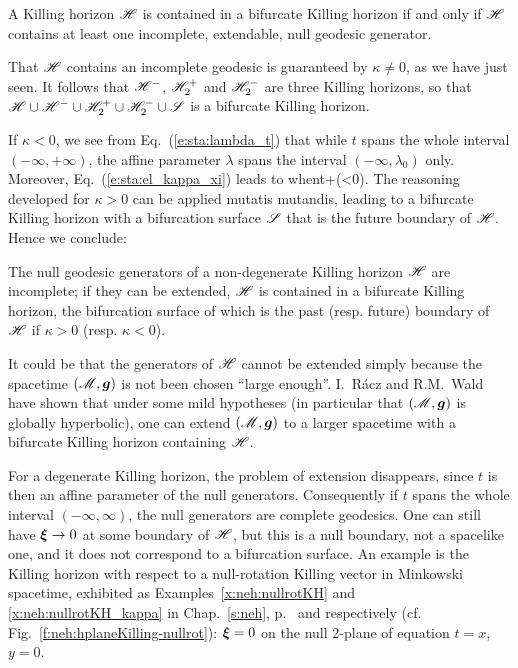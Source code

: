 \begin{prop}
\label{p:sta:Boyer_thm}
A Killing horizon $\mathscr{H}$ is contained in a bifurcate Killing horizon if and
only if $\mathscr{H}$ contains at least one incomplete, extendable, null geodesic
generator.
\end{prop}

That $\mathscr{H}$ contains an incomplete geodesic is guaranteed by
$\kappa\not=0$, as we have just seen.
It follows that $\mathscr{H}^-$, $\mathscr{H}_2^+$ and $\mathscr{H}_2^-$
are three Killing horizons, so that $\mathscr{H}\cup\mathscr{H}^-\cup\mathscr{H}_2^+\cup\mathscr{H}_2^-\cup\mathscr{S}$
is a bifurcate Killing horizon.

If $\kappa<0$, we see from Eq.~(\ref{e:sta:lambda_t}) that while $t$ spans the
whole interval $(-\infty,+\infty)$, the affine parameter $\lambda$ spans the
interval $(-\infty,\lambda_0)$ only. Moreover, Eq.~(\ref{e:sta:el_kappa_xi})
leads to
\be
    \w{\xi}  \quad\mbox{when}\quad t\rightarrow +\infty  \qquad (\kappa<0).
\ee
The reasoning developed for $\kappa>0$ can be applied mutatis mutandis,
leading to a bifurcate Killing horizon with a bifurcation surface $\mathscr{S}$ that
is the future boundary of $\mathscr{H}$. Hence we conclude:
\begin{prop}
\label{p:sta:non_degen_bifurcate}
The null geodesic generators of a non-degenerate Killing horizon $\mathscr{H}$ are
incomplete; if they can be extended, $\mathscr{H}$ is contained in a
bifurcate Killing horizon, the bifurcation surface of which is the past
(resp. future) boundary of $\mathscr{H}$ if $\kappa>0$ (resp. $\kappa<0$).
\end{prop}

\begin{remark}
\label{r:sta:extension_bifurcate}
It could be that the generators of $\mathscr{H}$ cannot be extended simply
because the spacetime $(\mathscr{M},\bm{g})$ is not been chosen ``large enough''.
I.~R\'acz and R.M.~Wald \cite{RaczW96}
have shown that under some mild hypotheses (in particular that $(\mathscr{M},\bm{g})$ is globally
hyperbolic), one can extend $(\mathscr{M},\bm{g})$ to a larger spacetime with a bifurcate
Killing horizon containing $\mathscr{H}$.
\end{remark}

\begin{remark}
For a degenerate Killing horizon, the problem of extension disappears, since
$t$ is then an affine parameter of the null generators. Consequently if $t$ spans
the whole interval $(-\infty,\infty)$, the null generators are complete
geodesics. One can still have $\bm{\xi}\rightarrow 0$ at some boundary
of $\mathscr{H}$, but this is a null boundary, not a spacelike one, and it does not
correspond to a bifurcation surface. An example is the Killing horizon with
respect to a null-rotation Killing vector in Minkowski spacetime, exhibited
as Examples~\ref{x:neh:nullrotKH} and \ref{x:neh:nullrotKH_kappa}
in Chap.~\ref{s:neh}, p.~\pageref{x:neh:nullrotKH} and \pageref{x:neh:nullrotKH_kappa}
respectively (cf. Fig.~\ref{f:neh:hplaneKilling-nullrot}): $\bm{\xi}=0$
on the null 2-plane of equation $t=x$, $y=0$.
\end{remark}

